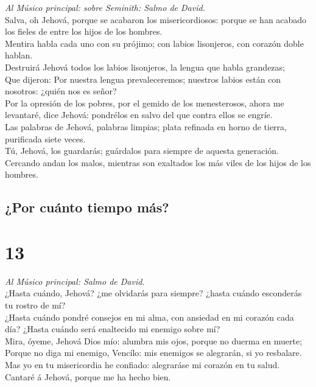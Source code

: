  \emph{Al Músico principal: sobre Seminith: Salmo de
David.}\\
Salva, oh Jehová, porque se acabaron los misericordiosos: porque se han
acabado los fieles de entre los hijos de los hombres.\\
 Mentira habla cada uno con su prójimo; con labios
lisonjeros, con corazón doble hablan.\\
 Destruirá Jehová todos los labios lisonjeros, la lengua que
habla grandezas;\\
 Que dijeron: Por nuestra lengua prevaleceremos; nuestros
labios están con nosotros: ¿quién nos es señor?\\
 Por la opresión de los pobres, por el gemido de los
menesterosos, ahora me levantaré, dice Jehová: pondrélos en salvo del
que contra ellos se engríe.\\
 Las palabras de Jehová, palabras limpias; plata refinada en
horno de tierra, purificada siete veces.\\
 Tú, Jehová, los guardarás; guárdalos para siempre de
aquesta generación.\\
 Cercando andan los malos, mientras son exaltados los más
viles de los hijos de los hombres.

\hypertarget{por-cuuxe1nto-tiempo-muxe1s}{%
\subsection{¿Por cuánto tiempo más?}\label{por-cuuxe1nto-tiempo-muxe1s}}

\hypertarget{section-12}{%
\section{13}\label{section-12}}

 \emph{Al Músico principal: Salmo de David.}\\
¿Hasta cuándo, Jehová? ¿me olvidarás para siempre? ¿hasta cuándo
esconderás tu rostro de mí?\\
 ¿Hasta cuándo pondré consejos en mi alma, con ansiedad en
mi corazón cada día? ¿Hasta cuándo será enaltecido mi enemigo sobre
mí?\\
 Mira, óyeme, Jehová Dios mío: alumbra mis ojos, porque no
duerma en muerte;\\
 Porque no diga mi enemigo, Vencílo: mis enemigos se
alegrarán, si yo resbalare.\\
 Mas yo en tu misericordia he confiado: alegraráse mi
corazón en tu salud.\\
 Cantaré á Jehová, porque me ha hecho bien.


